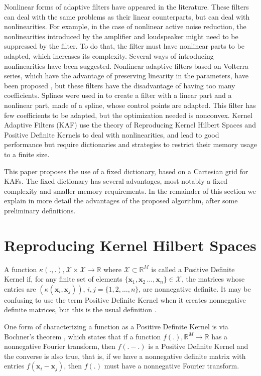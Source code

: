 Nonlinear forms of adaptive filters have appeared in the literature. These filters can deal with the same problems as their linear counterparts, but can deal with nonlinearities. 
For example, in the case of nonlinear active noise reduction, the nonlinearities introduced by the amplifier and loudspeaker might need to be suppressed by the filter. To do 
that, the filter must have nonlinear parts to be adapted, which increases its complexity. Several ways of introducing nonlinearities have been suggested. 
Nonlinear adaptive filters based on Volterra series, which have the advantage of preserving linearity in the parameters, have been proposed \cite{taiho_koh_second-order_1985}, but these filters have the disadvantage of having too many coefficients.
Splines were used in \cite{scarpiniti_nonlinear_2013} to create a filter with a linear part and a nonlinear part, made of a spline, whose control points are adapted. This filter has few coefficients to be adapted, but the optimization needed is nonconvex.
Kernel Adaptive Filters (KAF) \cite{principe_kernel_2010} use the theory of Reproducing Kernel Hilbert Spaces and Positive Definite Kernels to deal with nonlinearities, and lead to good performance but require dictionaries and strategies to restrict their memory usage to a finite size.

This paper proposes the use of a fixed dictionary, based on a Cartesian grid for KAFs. The fixed dictionary has several advantages, most notably a fixed complexity and smaller memory requirements. In the remainder of this section we explain in more detail the advantages of the proposed algorithm, after some preliminary definitions.

\section{Reproducing Kernel Hilbert Spaces}

A function $\kappa(.,.), \mathcal{X}\times\mathcal{X}\rightarrow\mathbb{R}$ where $\mathcal{X} \subset \mathbb{R}^M$ is called a Positive Definite Kernel if, for any 
finite set of elements $\{\mathbf{x}_1,\mathbf{x}_2\,\dots,\mathbf{x}_n\} \in \mathcal{X}$, the matrices whose entries are $(\kappa(\mathbf{x}_i,\mathbf{x}_j))$, 
$i,j = \{1,2,\dots,n\}$, are nonnegative definite. It may be confusing to use the term Positive Definite Kernel when it creates nonnegative definite matrices, but this 
is the usual definition \cite{paulsen_introduction_2016}.

One form of characterizing a function as a Positive Definite Kernel is via Bochner's theorem \cite{wendland_scattered_2005}, which states that if a function $f(.), \mathbb{R}^M\rightarrow\mathbb{R}$ 
has a nonnegative Fourier transform, then $f(.-.)$ is a Positive Definite Kernel and the converse is also true, that is, if we have a nonnegative definite matrix with 
entries $f(\mathbf{x}_i-\mathbf{x}_j)$, then $f(.)$ must have a nonnegative Fourier transform.

